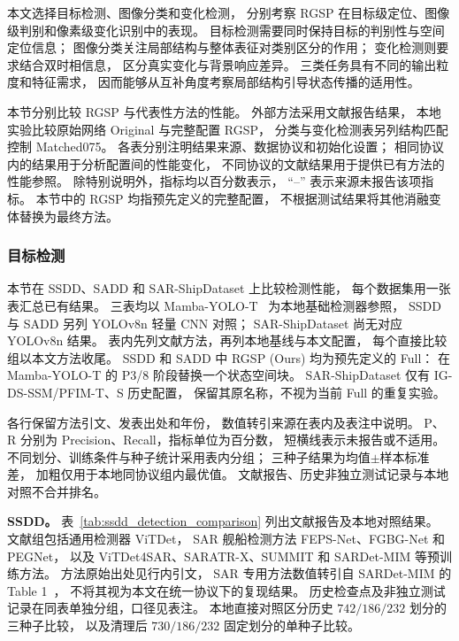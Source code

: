 \documentclass[journal]{IEEEtran}
\begin{document}
本文选择目标检测、图像分类和变化检测，
分别考察 RGSP 在目标级定位、图像级判别和像素级变化识别中的表现。
目标检测需要同时保持目标的判别性与空间定位信息；
图像分类关注局部结构与整体表征对类别区分的作用；
变化检测则要求结合双时相信息，
区分真实变化与背景响应差异。
三类任务具有不同的输出粒度和特征需求，
因而能够从互补角度考察局部结构引导状态传播的适用性。

本节分别比较 RGSP 与代表性方法的性能。
外部方法采用文献报告结果，
本地实验比较原始网络 Original 与完整配置 RGSP，
分类与变化检测表另列结构匹配控制 Matched075。
各表分别注明结果来源、数据协议和初始化设置；
相同协议内的结果用于分析配置间的性能变化，
不同协议的文献结果用于提供已有方法的性能参照。
除特别说明外，指标均以百分数表示，
``--'' 表示来源未报告该项指标。
本节中的 RGSP 均指预先定义的完整配置，
不根据测试结果将其他消融变体替换为最终方法。

\subsubsection{目标检测}
\label{sec:detection_results}

本节在 SSDD、SADD 和 SAR-ShipDataset 上比较检测性能，
每个数据集用一张表汇总已有结果。
三表均以 Mamba-YOLO-T~\cite{mambayolo2024} 为本地基础检测器参照，
SSDD 与 SADD 另列 YOLOv8n 轻量 CNN 对照；
SAR-ShipDataset 尚无对应 YOLOv8n 结果。
表内先列文献方法，再列本地基线与本文配置，
每个直接比较组以本文方法收尾。
SSDD 和 SADD 中 RGSP (Ours) 均为预先定义的 Full：
在 Mamba-YOLO-T 的 P3/8 阶段替换一个状态空间块。
SAR-ShipDataset 仅有 IG-DS-SSM/PFIM-T、S 历史配置，
保留其原名称，不视为当前 Full 的重复实验。

各行保留方法引文、发表出处和年份，
数值转引来源在表内及表注中说明。
P、R 分别为 Precision、Recall，指标单位为百分数，
短横线表示未报告或不适用。
不同划分、训练条件与种子统计采用表内分组；
三种子结果为均值$\pm$样本标准差，
加粗仅用于本地同协议组内最优值。
文献报告、历史非独立测试记录与本地对照不合并排名。

\textbf{SSDD。}
表~\ref{tab:ssdd_detection_comparison}
列出文献报告及本地对照结果。
文献组包括通用检测器 ViTDet，
SAR 舰船检测方法 FEPS-Net、FGBG-Net 和 PEGNet，
以及 ViTDet4SAR、SARATR-X、SUMMIT 和 SARDet-MIM
等预训练方法。
方法原始出处见行内引文，
SAR 专用方法数值转引自 SARDet-MIM 的 Table 1~\cite{sardetmim2026}，
不将其视为本文在统一协议下的复现结果。
历史检查点及非独立测试记录在同表单独分组，口径见表注。
本地直接对照区分历史 $742/186/232$ 划分的三种子比较，
以及清理后 $730/186/232$ 固定划分的单种子比较。
\end{document}
